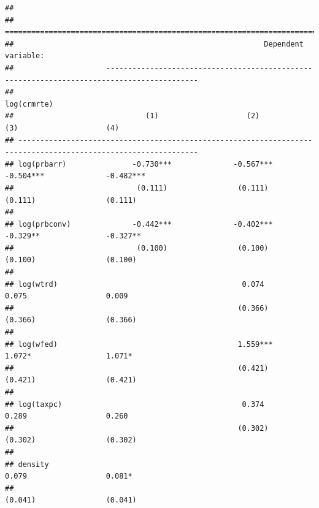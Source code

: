 \documentclass[]{article}
\begin{document}
\begin{verbatim}
## 
## ===============================================================================================================
##                                                         Dependent variable:                                    
##                     -------------------------------------------------------------------------------------------
##                                                             log(crmrte)                                        
##                              (1)                    (2)                    (3)                    (4)          
## ---------------------------------------------------------------------------------------------------------------
## log(prbarr)               -0.730***              -0.567***              -0.504***              -0.482***       
##                            (0.111)                (0.111)                (0.111)                (0.111)        
##                                                                                                                
## log(prbconv)              -0.442***              -0.402***               -0.329**               -0.327**       
##                            (0.100)                (0.100)                (0.100)                (0.100)        
##                                                                                                                
## log(wtrd)                                          0.074                  0.075                  0.009         
##                                                   (0.366)                (0.366)                (0.366)        
##                                                                                                                
## log(wfed)                                         1.559***                1.072*                 1.071*        
##                                                   (0.421)                (0.421)                (0.421)        
##                                                                                                                
## log(taxpc)                                         0.374                  0.289                  0.260         
##                                                   (0.302)                (0.302)                (0.302)        
##                                                                                                                
## density                                                                   0.079                  0.081*        
##                                                                          (0.041)                (0.041)        

\end{verbatim}
\end{document}
